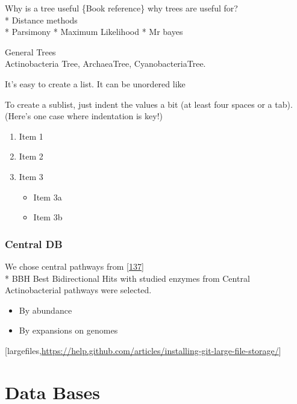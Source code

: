 \documentclass[12pt,twoside]{reedthesis}
\providecommand{\tightlist}{%
  \setlength{\itemsep}{0pt}\setlength{\parskip}{0pt}}
\begin{document}
  Why is a tree useful \{Book reference\} why trees are useful for?\\
  * Distance methods\\
  * Parsimony * Maximum Likelihood * Mr bayes
  
  General Trees\\
  Actinobacteria Tree, ArchaeaTree, CyanobacteriaTree.
  
  It's easy to create a list. It can be unordered like
  
  To create a sublist, just indent the values a bit (at least four spaces
  or a tab). (Here's one case where indentation is key!)
  
  \begin{enumerate}
  \def\labelenumi{\arabic{enumi}.}
  \tightlist
  \item
    Item 1
  \item
    Item 2
  \item
    Item 3
  
    \begin{itemize}
    \tightlist
    \item
      Item 3a
    \item
      Item 3b
    \end{itemize}
  \end{enumerate}
  
  \subsubsection{Central DB}\label{central-db}
  
  We chose central pathways from
  {[}\protect\hyperlink{ref-barona-gomezux5fwhatux5f2012}{137}{]}\\
  * BBH Best Bidirectional Hits with studied enzymes from Central
  Actinobacterial pathways were selected.
  
  \begin{itemize}
  \item
    By abundance
  \item
    By expansions on genomes
  \end{itemize}
  
  {[}largefiles,\url{https://help.github.com/articles/installing-git-large-file-storage/}{]}
  
  \section{Data Bases}\label{data-bases}
  
\end{document}
